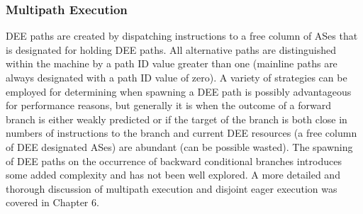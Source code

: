 \documentclass{book}
\begin{document}
\subsubsection{Multipath Execution}
%
DEE paths are created by dispatching instructions to a 
free column of ASes that is designated for holding DEE paths.
All alternative paths are distinguished within the machine
by a path ID value greater than one (mainline paths are always
designated with a path ID value of zero).
A variety of strategies can be employed for determining when
spawning a DEE path is possibly advantageous for performance reasons,
but generally it is when the outcome of a forward branch is either
weakly predicted or if the target of the branch is both close
in numbers of instructions to the branch and current DEE resources (a
free column of DEE designated ASes) are abundant (can be possible
wasted).  
The spawning of DEE paths on the occurrence of backward conditional
branches introduces some added complexity
and has not been well explored.
A more detailed and thorough discussion of multipath execution and
disjoint eager execution was covered in Chapter 6.
%
%
%
%
%
\end{document}
